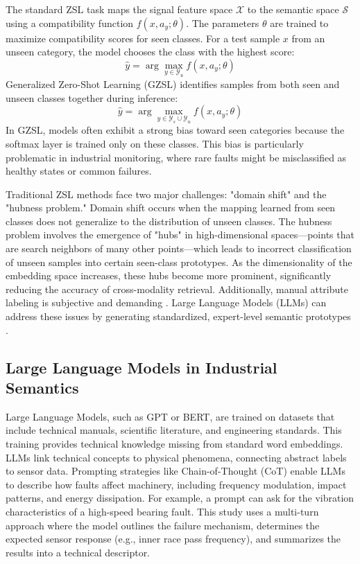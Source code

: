 \documentclass[journal]{IEEEtran}
\begin{document}
The standard ZSL task maps the signal feature space $\mathcal{X}$ to the semantic space $\mathcal{S}$ using a compatibility function $f(x, a_y; \theta)$. The parameters $\theta$ are trained to maximize compatibility scores for seen classes. For a test sample $x$ from an unseen category, the model chooses the class with the highest score:
\begin{equation}
\hat{y} = \arg\max_{y \in \mathcal{Y}_u} f(x, a_y; \theta)
\end{equation}
Generalized Zero-Shot Learning (GZSL) identifies samples from both seen and unseen classes together during inference:
\begin{equation}
\hat{y} = \arg\max_{y \in \mathcal{Y}_s \cup \mathcal{Y}_u} f(x, a_y; \theta)
\end{equation}
In GZSL, models often exhibit a strong bias toward seen categories because the softmax layer is trained only on these classes. This bias is particularly problematic in industrial monitoring, where rare faults might be misclassified as healthy states or common failures.

Traditional ZSL methods face two major challenges: "domain shift" and the "hubness problem." Domain shift occurs when the mapping learned from seen classes does not generalize to the distribution of unseen classes. The hubness problem involves the emergence of "hubs" in high-dimensional spaces—points that are search neighbors of many other points—which leads to incorrect classification of unseen samples into certain seen-class prototypes. As the dimensionality of the embedding space increases, these hubs become more prominent, significantly reducing the accuracy of cross-modality retrieval. Additionally, manual attribute labeling is subjective and demanding \cite{palatucci2009zero, lampert2009learning}. Large Language Models (LLMs) can address these issues by generating standardized, expert-level semantic prototypes \cite{xian2018zero}.

\subsection{Large Language Models in Industrial Semantics}
Large Language Models, such as GPT or BERT, are trained on datasets that include technical manuals, scientific literature, and engineering standards. This training provides technical knowledge missing from standard word embeddings. LLMs link technical concepts to physical phenomena, connecting abstract labels to sensor data. Prompting strategies like Chain-of-Thought (CoT) enable LLMs to describe how faults affect machinery, including frequency modulation, impact patterns, and energy dissipation. For example, a prompt can ask for the vibration characteristics of a high-speed bearing fault. This study uses a multi-turn approach where the model outlines the failure mechanism, determines the expected sensor response (e.g., inner race pass frequency), and summarizes the results into a technical descriptor.
\end{document}
